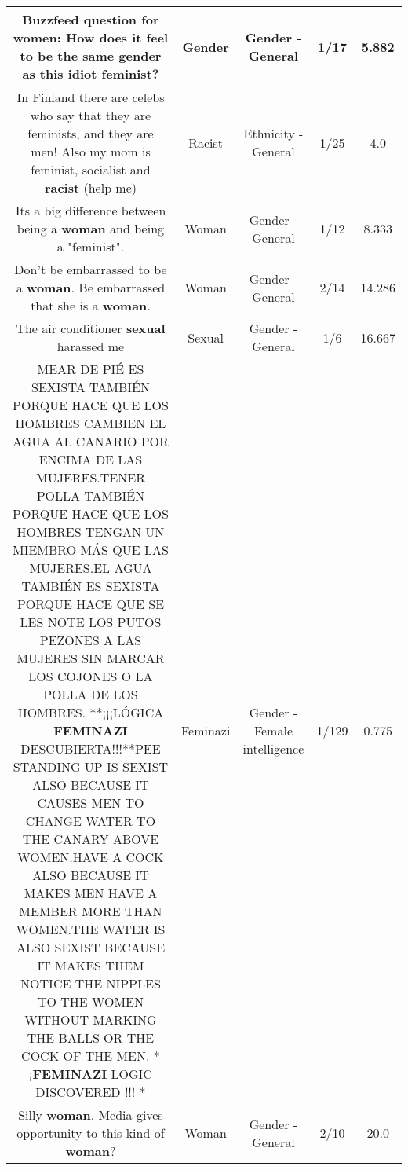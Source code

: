 \documentclass[11pt]{article}
\newlength\mylength
\begin{document}
\begin{center}
\begin{longtable}{|C{.65\mylength}|C{.30\mylength}|C{.12\mylength}|C{.12\mylength}|C{.12\mylength}|}
  \small Buzzfeed question for women: How does it feel to be the same \textbf{gender} as this idiot feminist?\normalsize   & Gender & Gender - General & 1/17 & 5.882 \\  \hline
  \small In Finland there are celebs who say that they are feminists, and they are men! Also my mom is feminist, socialist and \textbf{racist} (help me)\normalsize   & Racist & Ethnicity - General & 1/25 & 4.0 \\  \hline
  \small Its a big difference between being a \textbf{woman} and being a "feminist".\normalsize   & Woman & Gender - General & 1/12 & 8.333 \\  \hline
  \small Don't be embarrassed to be a \textbf{woman}.  Be embarrassed that she is a \textbf{woman}.\normalsize   & Woman & Gender - General & 2/14 & 14.286 \\  \hline
  \small The air conditioner \textbf{sexual} harassed me\normalsize   & Sexual & Gender - General & 1/6 & 16.667 \\  \hline
  \small MEAR DE PIÉ ES SEXISTA TAMBIÉN PORQUE HACE QUE LOS HOMBRES CAMBIEN EL AGUA AL CANARIO POR ENCIMA DE LAS MUJERES.TENER POLLA TAMBIÉN PORQUE HACE QUE LOS HOMBRES TENGAN UN MIEMBRO MÁS QUE LAS MUJERES.EL AGUA TAMBIÉN ES SEXISTA PORQUE HACE QUE SE LES NOTE LOS PUTOS PEZONES A LAS MUJERES SIN MARCAR LOS COJONES O LA POLLA DE LOS HOMBRES. **¡¡¡LÓGICA \textbf{FEMINAZI} DESCUBIERTA!!!**PEE STANDING UP IS SEXIST ALSO BECAUSE IT CAUSES MEN TO CHANGE WATER TO THE CANARY ABOVE WOMEN.HAVE A COCK ALSO BECAUSE IT MAKES MEN HAVE A MEMBER MORE THAN WOMEN.THE WATER IS ALSO SEXIST BECAUSE IT MAKES THEM NOTICE THE NIPPLES TO THE WOMEN WITHOUT MARKING THE BALLS OR THE COCK OF THE MEN. * ¡\textbf{FEMINAZI} LOGIC DISCOVERED !!! *\normalsize   & Feminazi & Gender - Female intelligence & 1/129 & 0.775 \\  \hline
  \small Silly \textbf{woman}. Media gives opportunity to this kind of \textbf{woman}?\normalsize   & Woman & Gender - General & 2/10 & 20.0 \\  \hline

\end{longtable}
\end{center}
\end{document}
